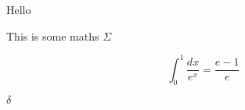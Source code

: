 \documentclass{article}
\begin{document}
Hello

This is some maths $\Sigma$

\[ \int_0^1 \frac{dx}{e^x} = \frac{e-1}{e} \]

$\delta$
\end{document}
